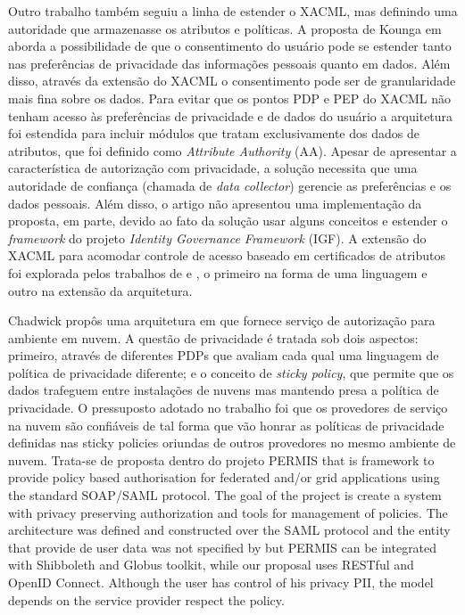 \documentclass{doublecol-new}
\begin{document}
Outro trabalho \cite{kounga2010extending} também seguiu a linha de estender o XACML, mas definindo uma autoridade que armazenasse os atributos e políticas. A proposta de Kounga em \cite{kounga2010extending} aborda a possibilidade de que o consentimento do usuário pode se estender tanto nas preferências de privacidade das informações pessoais quanto em dados. Além disso, através da extensão do XACML o consentimento pode ser de granularidade mais fina sobre os dados. Para evitar que os pontos PDP e PEP do XACML não tenham acesso às preferências de privacidade e de dados do usuário a arquitetura foi estendida para incluir módulos que tratam exclusivamente dos dados de atributos, que foi definido como \textit{Attribute Authority} (AA). Apesar de apresentar a característica de autorização com privacidade, a solução necessita que uma autoridade de confiança (chamada de \textit{data collector}) gerencie as preferências e os dados pessoais. Além disso, o artigo não apresentou uma implementação da proposta, em parte, devido ao fato da solução usar alguns conceitos e estender o \textit{framework} do projeto \textit{Identity Governance Framework} (IGF). A extensão do XACML para acomodar controle de acesso baseado em certificados de atributos foi explorada pelos trabalhos de \citep{camenisch2009credential} e \citep{dagdee2011extending}, o primeiro na forma de uma linguagem e outro na extensão da arquitetura.

Chadwick propôs uma arquitetura em \cite{chadwick2012privacy} que fornece serviço de autorização para ambiente em nuvem. A questão de privacidade é tratada sob dois aspectos: primeiro, através de diferentes PDPs que avaliam cada qual uma linguagem de política de privacidade diferente; e o conceito de \textit{sticky policy}, que permite que os dados trafeguem entre instalações de nuvens mas mantendo presa a política de privacidade. O pressuposto adotado no trabalho foi que os provedores de serviço na nuvem são confiáveis de tal forma que vão honrar as políticas de privacidade definidas nas sticky policies oriundas de outros provedores no mesmo ambiente de nuvem. Trata-se de proposta dentro do projeto PERMIS \cite{chadwick2008permis} that is framework to provide policy based authorisation for federated and/or grid applications using the standard SOAP/SAML protocol. The goal of the project is create a system with privacy preserving authorization and tools for management of policies. The architecture was defined and constructed over the SAML protocol and the entity that provide de user data was not specified by \cite{chadwick2012privacy} but PERMIS can be integrated with Shibboleth and Globus toolkit, while our proposal uses RESTful and OpenID Connect. Although the user has control of his privacy PII, the model depends on the service provider respect the policy.
\end{document}
